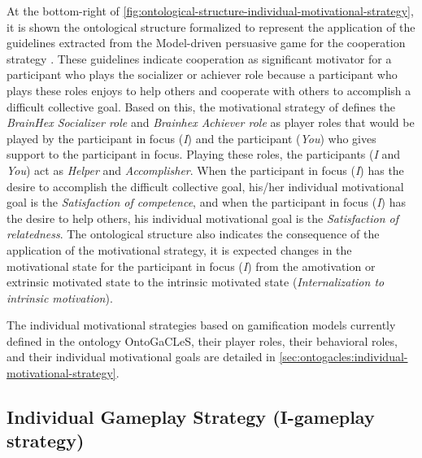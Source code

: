 At the bottom-right of \autoref{fig:ontological-structure-individual-motivational-strategy}, it is shown the ontological structure formalized to represent the application of the guidelines extracted from the Model-driven persuasive game for the cooperation strategy \cite{OrjiVassilevaMandryk2014}.
These guidelines indicate cooperation as significant motivator for a participant who plays the socializer or achiever role because a participant who plays these roles enjoys to help others and cooperate with others to accomplish a difficult collective goal.
Based on this, the motivational strategy of  defines the \emph{BrainHex Socializer role} and \emph{Brainhex Achiever role} as player roles that would be played by the participant in focus (\emph{I}) and the participant (\emph{You}) who gives support to the participant in focus.
Playing these roles, the participants (\emph{I} and \emph{You}) act as \emph{Helper} and \emph{Accomplisher}. When the participant in focus (\emph{I}) has the desire to accomplish the difficult collective goal, his/her individual motivational goal is the \emph{Satisfaction of competence}, and when the participant in focus (\emph{I}) has the desire to help others, his individual motivational goal is the \emph{Satisfaction of relatedness}.
The ontological structure also indicates the consequence of the application of the motivational strategy, it is expected changes in the motivational state for the participant in focus (\emph{I}) from the amotivation or extrinsic motivated state to the intrinsic motivated state (\emph{Internalization to intrinsic motivation}).

The individual motivational strategies based on gamification models currently defined in the ontology OntoGaCLeS, their player roles, their behavioral roles, and their individual motivational goals are detailed in \autoref{sec:ontogacles:individual-motivational-strategy}.

\subsection{Individual Gameplay Strategy (I-gameplay strategy)}
\label{sec:individual-gameplay-strategy}

